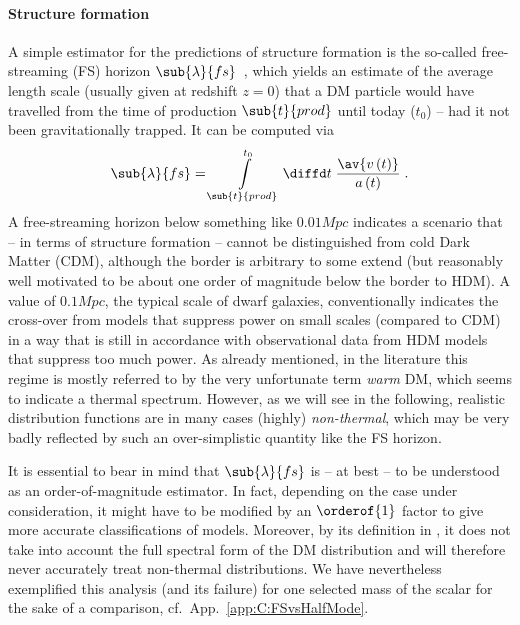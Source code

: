 \paragraph{Structure formation}
A simple estimator for the predictions of structure formation is the so-called free-streaming (FS) horizon $\sub{\lambda}{fs}$~\cite{Boyarsky:2008xj}, which yields an estimate of the average length scale (usually given at redshift $z=0$) that a DM particle would have travelled from the time of production $\sub{t}{prod}$ until today ($t_0$) -- had it not been gravitationally trapped. It can be computed via
\begin{align}
 \sub{\lambda}{fs} = \int\limits_{\sub{t}{prod}}^{t_0}{\diffd t \; \frac{\av{v\left(t\right)}}{a\left(t\right)}} \;.
 \label{eq:Def:LambdaFS}
\end{align}
A free-streaming horizon below something like $\unit{0.01}{Mpc}$ indicates a scenario that -- in terms of structure formation -- cannot be distinguished from cold Dark Matter (CDM), although the border is arbitrary to some extend (but reasonably well motivated to be about one order of magnitude below the border to HDM). A value of $\unit{0.1}{Mpc}$, the typical scale of dwarf galaxies, conventionally indicates the cross-over from models that suppress power on small scales (compared to CDM) in a way that is still in accordance with observational data from HDM models that suppress too much power. As already mentioned, in the literature this regime is mostly referred to by the very unfortunate term \emph{warm} DM, which seems to indicate a thermal spectrum. However, as we will see in the following, realistic distribution functions are in many cases (highly) \emph{non-thermal}, which may be very badly reflected by such an over-simplistic quantity like the FS horizon.

It is essential to bear in mind that $\sub{\lambda}{fs}$ is -- at best -- to be understood as an order-of-magnitude estimator. In fact, depending on the case under consideration, it might have to be modified by an $\orderof{1}$ factor to give more accurate classifications of models. Moreover, by its definition in , it does not take into account the full spectral form of the DM distribution and will therefore never accurately treat non-thermal distributions. We have nevertheless exemplified this analysis (and its failure) for one selected mass of the scalar for the sake of a comparison, cf.\ App.~\ref{app:C:FSvsHalfMode}.

